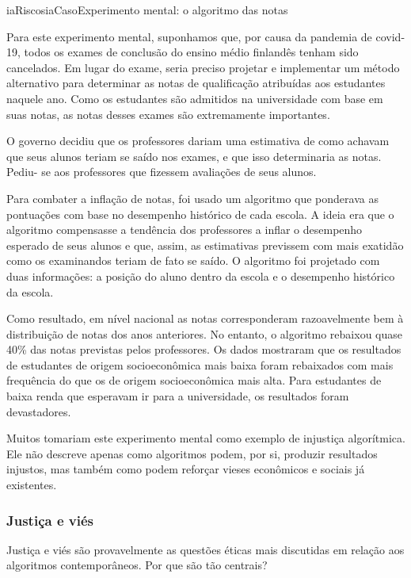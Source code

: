 \documentclass[
  11pt,
]{article}
\newenvironment{definicao}[1][Definicao]{\begin{iabox}{iaRiscos}{iaCaso}{#1}}{\end{iabox}}
\begin{document}
\begin{definicao}[Experimento mental: o algoritmo das notas]

Para este experimento mental, suponhamos que, por causa da pandemia de
covid-19, todos os exames de conclusão do ensino médio finlandês tenham
sido cancelados. Em lugar do exame, seria preciso projetar e implementar
um método alternativo para determinar as notas de qualificação
atribuídas aos estudantes naquele ano. Como os estudantes são admitidos
na universidade com base em suas notas, as notas desses exames são
extremamente importantes.

O governo decidiu que os professores dariam uma estimativa de como
achavam que seus alunos teriam se saído nos exames, e que isso
determinaria as notas. Pediu- se aos professores que fizessem avaliações
de seus alunos.

Para combater a inflação de notas, foi usado um algoritmo que ponderava
as pontuações com base no desempenho histórico de cada escola. A ideia
era que o algoritmo compensasse a tendência dos professores a inflar o
desempenho esperado de seus alunos e que, assim, as estimativas
previssem com mais exatidão como os examinandos teriam de fato se saído.
O algoritmo foi projetado com duas informações: a posição do aluno
dentro da escola e o desempenho histórico da escola.

Como resultado, em nível nacional as notas corresponderam razoavelmente
bem à distribuição de notas dos anos anteriores. No entanto, o algoritmo
rebaixou quase 40\% das notas previstas pelos professores. Os dados
mostraram que os resultados de estudantes de origem socioeconômica mais
baixa foram rebaixados com mais frequência do que os de origem
socioeconômica mais alta. Para estudantes de baixa renda que esperavam
ir para a universidade, os resultados foram devastadores.

\end{definicao}

Muitos tomariam este experimento mental como exemplo de injustiça
algorítmica. Ele não descreve apenas como algoritmos podem, por si,
produzir resultados injustos, mas também como podem reforçar vieses
econômicos e sociais já existentes.

\subsubsection{Justiça e viés}\label{justiuxe7a-e-viuxe9s}

Justiça e viés são provavelmente as questões éticas mais discutidas em
relação aos algoritmos contemporâneos. Por que são tão centrais?
\end{document}
